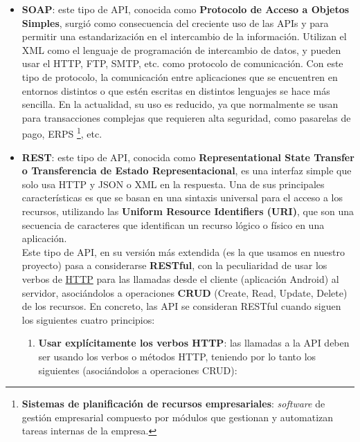     \begin{itemize}
        \item \textbf{SOAP}: este tipo de API, conocida como \textbf{Protocolo de Acceso a
        Objetos Simples}, surgió como consecuencia del creciente uso de las APIs y para
        permitir una estandarización en el intercambio de la información. Utilizan el XML
        como el lenguaje de programación de intercambio de datos, y pueden usar el HTTP,
        FTP, SMTP, etc. como protocolo de comunicación. Con este tipo de protocolo, la
        comunicación entre aplicaciones que se encuentren en entornos distintos o que estén
        escritas en distintos lenguajes se hace más sencilla. En la actualidad, su uso es
        reducido, ya que normalmente se usan para transacciones complejas que requieren
        alta seguridad, como pasarelas de pago, ERPS \footnote{\textbf{Sistemas de
        planificación de recursos empresariales}: \textit{software} de gestión empresarial
        compuesto por módulos que gestionan y automatizan tareas internas de la empresa.},
        etc.

        \item \textbf{REST}: este tipo de API, conocida como \textbf{Representational State
        Transfer o Transferencia de Estado Representacional}, es una interfaz simple que
        solo usa HTTP y JSON o XML en la respuesta. Una de sus principales características
        es que se basan en una sintaxis universal para el acceso a los recursos, utilizando
        las \textbf{Uniform Resource Identifiers (URI)}, que son una secuencia de caracteres
        que identifican un recurso lógico o físico en una aplicación.\\
        
        Este tipo de API, en su versión más extendida (es la que usamos en nuestro proyecto)
        pasa a considerarse \textbf{RESTful}, con la peculiaridad de usar los verbos de
        \href{https://developer.mozilla.org/es/docs/Web/HTTP/Methods}{HTTP} para las
        llamadas desde el cliente (aplicación Android) al servidor, asociándolos a
        operaciones \textbf{CRUD} (Create, Read, Update, Delete) de los recursos. En
        concreto, las API se consideran RESTful cuando siguen los siguientes cuatro
        principios:

            \begin{enumerate}
                \item \textbf{Usar explícitamente los verbos HTTP}: las llamadas a la API
                deben ser usando los verbos o métodos HTTP, teniendo por lo tanto los
                siguientes (asociándolos a operaciones CRUD):
                    

\end{enumerate}
\end{itemize}
